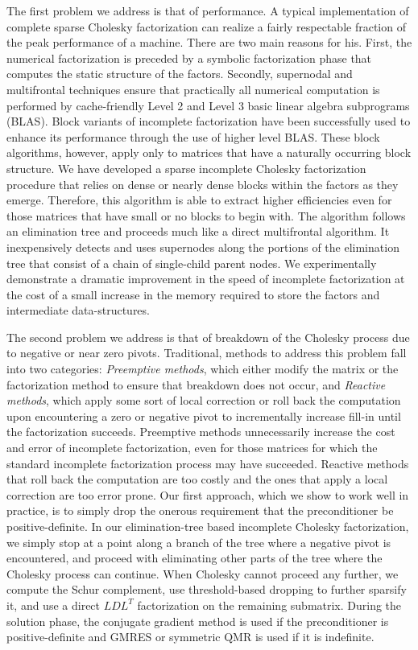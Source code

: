 \documentclass{report}
\begin{document}
The first problem we address is that of performance. A typical
implementation of complete sparse Cholesky factorization
can realize a fairly respectable fraction of the peak performance of a
machine. There are two main reasons for his. First, the numerical
factorization is preceded by a symbolic factorization phase that
computes the static structure of the factors.
Secondly, supernodal and multifrontal
techniques ensure that practically all numerical computation is performed by
cache-friendly Level 2 and Level 3 basic linear algebra subprograms
(BLAS). Block variants of incomplete
factorization have been successfully used to enhance its performance
through the use of higher level BLAS.
These block algorithms, however, apply only to matrices that
have a naturally occurring block structure. We have developed a sparse
incomplete Cholesky factorization procedure that relies on dense or nearly
dense blocks within the factors as they emerge. Therefore, this
algorithm is able to extract higher efficiencies even for those matrices
that have small or no blocks to begin with.
The algorithm follows an elimination
tree and proceeds much like a direct multifrontal
algorithm. It inexpensively detects and uses supernodes along the
portions of the elimination tree that consist of a chain of single-child
parent nodes. We experimentally demonstrate a dramatic improvement in
the speed of incomplete factorization at the cost of a small increase
in the memory required to store the factors and intermediate data-structures.

The second problem we address is that of breakdown of the Cholesky
process due to negative or near zero pivots. Traditional, methods
to address this problem fall into two categories:
{\em Preemptive methods}, which either modify the matrix or the
factorization method to ensure that breakdown does not occur, and
{\em Reactive methods}, which apply some sort of local correction or roll
back the computation upon encountering a zero or negative pivot
to incrementally increase fill-in until the factorization succeeds.
Preemptive methods unnecessarily increase the cost and error of incomplete
factorization, even for those matrices for which the standard
incomplete factorization process may have succeeded. Reactive methods
that roll back the computation are too costly and the ones that apply
a local correction are too error prone. Our first approach, which we
show to work well in practice, is to simply drop the onerous requirement
that the preconditioner be positive-definite. In our elimination-tree
based incomplete Cholesky factorization, we simply stop at a point along
a branch of the tree where a negative pivot is encountered, and proceed
with eliminating other parts of the tree where the Cholesky process can
continue. When Cholesky cannot proceed any further, we compute the
Schur complement, use threshold-based dropping to further sparsify it,
and use a direct $LDL^T$ factorization on the remaining submatrix.
During the solution phase, the conjugate gradient method is used if the
preconditioner is positive-definite and GMRES or symmetric QMR is used
if it is indefinite.
\end{document}
